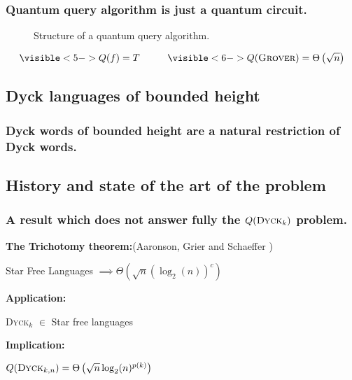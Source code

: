 \documentclass[9pt, notheorems]{beamer}
\newcommand{\Dyck}[1]{\textsc{Dyck$_{#1}$}}
\renewcommand{\comment}[1]{}
\theoremstyle{definition}
\theoremstyle{plain}
\theoremstyle{definition}
\begin{document}
\begin{frame}
    \frametitle{Quantum query algorithm is just a quantum circuit.}
    \begin{figure}
        \centering

        
        \caption{Structure of a quantum query algorithm.}
        \label{fig:quantum_query_algorithm_structure}
    \end{figure}
    {\Huge \[\visible<5->{Q(f)=T} \hspace*{1cm} \visible<6->{Q(\textsc{Grover})=\Theta\left(\sqrt{n}\right)} \]}
\end{frame}

\subsection{Dyck languages of bounded height}

\begin{frame}
    \frametitle{Dyck words of bounded height are a natural restriction of Dyck words.}
    \begin{figure}
        
    \end{figure}
    \visible<10>{
        {\Huge \[\Dyck{k}\]}}
\end{frame}

\subsection{History and state of the art of the problem}

\begin{frame}
    \frametitle{A result which does not answer fully the $Q(\Dyck{k})$ problem.}
    \vfill
    \textbf{The Trichotomy theorem:}(Aaronson,
    Grier and Schaeffer \cite[2019]{trichotomy_not_andris})
    \begin{center}
        {\huge Star Free Languages $\implies \Theta\left(\sqrt{n}(\log_2(n))^c\right)$ }\\
    \end{center}
    \vfill
    \pause
    \textbf{Application:}
    \begin{center}
        {\huge \Dyck{k} $\in$ Star free languages}
    \end{center}
    \pause
    \vfill
    \textbf{Implication:}
    \begin{center}
        {\huge $\comment{\exists p, }Q(\Dyck{k,n})=\Theta \left(\sqrt{n}\log_2(n)^{p(k)}\right)$}
    \end{center}
    \vfill
\end{frame}
\end{document}
